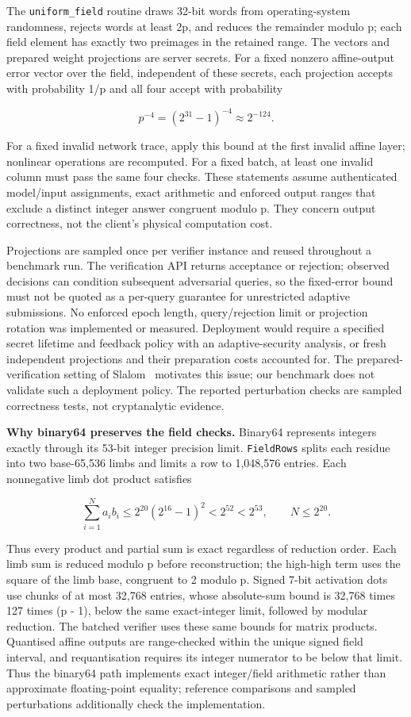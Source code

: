 \documentclass[11pt]{article}
\begin{document}
The \texttt{uniform\_field} routine draws 32-bit words from operating-system randomness, rejects words at least 2p, and reduces the remainder modulo p; each field element has exactly two preimages in the retained range. The vectors and prepared weight projections are server secrets. For a fixed nonzero affine-output error vector over the field, independent of these secrets, each projection accepts with probability 1/p and all four accept with probability

\[
p^{-4} = (2^{31}-1)^{-4} \approx 2^{-124}.
\]

For a fixed invalid network trace, apply this bound at the first invalid affine layer; nonlinear operations are recomputed. For a fixed batch, at least one invalid column must pass the same four checks. These statements assume authenticated model/input assignments, exact arithmetic and enforced output ranges that exclude a distinct integer answer congruent modulo p. They concern output correctness, not the client's physical computation cost.

Projections are sampled once per verifier instance and reused throughout a benchmark run. The verification API returns acceptance or rejection; observed decisions can condition subsequent adversarial queries, so the fixed-error bound must not be quoted as a per-query guarantee for unrestricted adaptive submissions. No enforced epoch length, query/rejection limit or projection rotation was implemented or measured. Deployment would require a specified secret lifetime and feedback policy with an adaptive-security analysis, or fresh independent projections and their preparation costs accounted for. The prepared-verification setting of Slalom~\citep{Tramer19} motivates this issue; our benchmark does not validate such a deployment policy. The reported perturbation checks are sampled correctness tests, not cryptanalytic evidence.

\textbf{Why binary64 preserves the field checks.} Binary64 represents integers exactly through its 53-bit integer precision limit. \texttt{FieldRows} splits each residue into two base-65,536 limbs and limits a row to 1,048,576 entries. Each nonnegative limb dot product satisfies

\[
\sum_{i=1}^{N} a_i b_i \leq 2^{20}(2^{16}-1)^2 < 2^{52} < 2^{53},
\qquad N \leq 2^{20}.
\]

Thus every product and partial sum is exact regardless of reduction order. Each limb sum is reduced modulo p before reconstruction; the high-high term uses the square of the limb base, congruent to 2 modulo p. Signed 7-bit activation dots use chunks of at most 32,768 entries, whose absolute-sum bound is 32,768 times 127 times (p - 1), below the same exact-integer limit, followed by modular reduction. The batched verifier uses these same bounds for matrix products. Quantised affine outputs are range-checked within the unique signed field interval, and requantisation requires its integer numerator to be below that limit. Thus the binary64 path implements exact integer/field arithmetic rather than approximate floating-point equality; reference comparisons and sampled perturbations additionally check the implementation.
\end{document}
